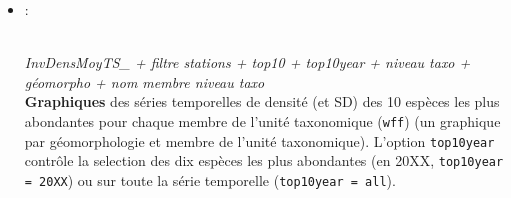 \documentclass{article}
\begin{document}
\begin{itemize}
\item[] \hypertarget{i9}{:}\\
        \emph{InvDensMoyTS\_ + filtre stations + top10 + top10year +
          niveau taxo + géomorpho + nom membre niveau taxo} \\

\textbf{Graphiques} des séries temporelles de densité (et SD) des 10
espèces les plus abondantes pour chaque membre de l'unité taxonomique
(\texttt{wff}) (un graphique par géomorphologie et
  membre de l'unité taxonomique). L'option \texttt{top10year} contrôle
  la selection des dix espèces les plus abondantes (en 20XX,
  \texttt{top10year = 20XX}) ou sur toute la série temporelle
  (\texttt{top10year = all}).

\end{itemize}
\end{document}
